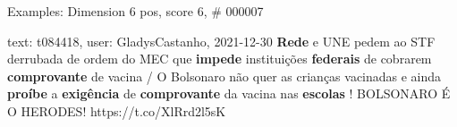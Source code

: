 \begin{frame}{Examples: Dimension 6 pos, score 6, \# 000007}
\footnotesize
\begin{exampleblock}{text: t084418, user: GladysCastanho, 2021-12-30}
\textbf{Rede} e UNE pedem ao STF derrubada de ordem do MEC que \textbf{impede} 
instituições \textbf{federais} de cobrarem \textbf{comprovante} de vacina / O 
Bolsonaro não quer as crianças vacinadas e ainda \textbf{proíbe} a 
\textbf{exigência} de \textbf{comprovante} da vacina nas \textbf{escolas} ! 
BOLSONARO É O HERODES! https://t.co/XlRrd2l5sK 
\end{exampleblock}
\end{frame}
